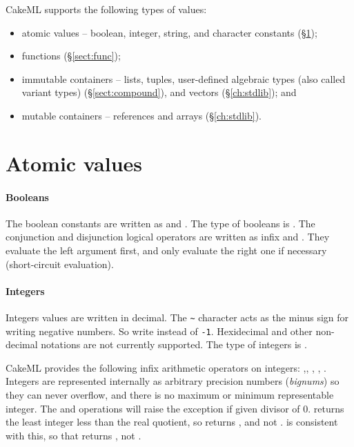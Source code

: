 \documentclass[12pt,a4paper]{book}
\begin{document}
CakeML supports the following types of values:
\begin{itemize}
  \item atomic values -- boolean, integer, string, and character constants (\S\ref{sect:val});
  \item functions (\S\ref{sect:func});
  \item immutable containers -- lists, tuples, user-defined algebraic types (also called variant types) (\S\ref{sect:compound}), and vectors (\S\ref{ch:stdlib}); and
  \item mutable containers -- references and arrays (\S\ref{ch:stdlib}).
\end{itemize}

\section{Atomic values}
\label{sect:val}

\paragraph{Booleans} The boolean constants are written as  and
. The type of booleans is . The conjunction and
disjunction logical operators are written as infix  and
. They evaluate the left argument first, and only evaluate the
right one if necessary (short-circuit evaluation).

\paragraph{Integers} Integers values are written in decimal. The
\texttt{\textasciitilde} character acts as the minus sign for writing negative
numbers. So write  instead of \texttt{-1}. Hexidecimal and other
non-decimal notations are not currently supported. The type of integers is
.

CakeML provides the following infix arithmetic operators on integers: \smlinline{+},\smlinline{-}, \smlinline{*}, , . Integers are represented internally as arbitrary precision numbers (\emph{bignums}) so they can never overflow, and there is no maximum or minimum representable integer. The  and  operations will raise the  exception if given divisor of 0.  returns the least integer less than the real quotient, so  returns , and not .  is consistent with this, so that  returns , not .
\end{document}
